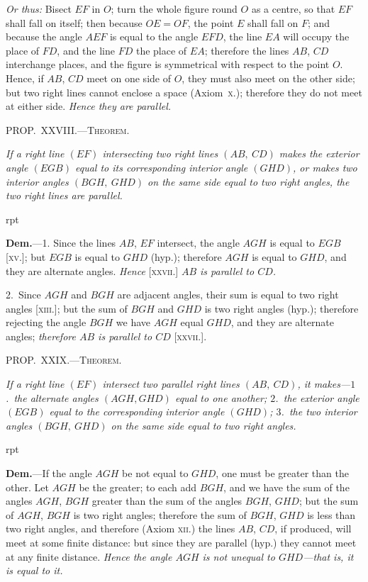 \documentclass[oneside]{book}
\newcounter{wrapwidth}
\newcommand\mypropl[2]{
\bigskip\Needspace*{4\baselineskip}\begin{center}\textsc{#1}\end{center}
\hspace{\parindent}\emph{#2}\par\medskip
}
\newcommand\imgflow[3]{
\setcounter{wrapwidth}{#1}

\begin{wrapfigure}[#2]{r}{\value{wrapwidth}pt}
\begin{center}
\vspace{-0.3in}

\end{center}
\end{wrapfigure}
}
\begin{document}
\textit{Or thus:} Bisect $EF$ in $O$; turn the whole figure
round $O$ as a centre, so that $EF$ shall fall on itself;
then because $OE = OF$, the point $E$ shall fall on $F$;
and because the angle $AEF$ is equal to the angle $EFD$,
the line $EA$ will occupy the place of $FD$, and the line
$FD$ the place of $EA$; therefore the lines $AB$, $CD$ interchange
places, and the figure is symmetrical with respect
to the point $O$. Hence, if $AB$, $CD$ meet on one
side of $O$, they must also meet on the other side; but
two right lines cannot enclose a space (Axiom~\textsc{x}.);
therefore they do not meet at either side. \textit{Hence they
are parallel.}


\mypropl{PROP\@.~XXVIII\@.---Theorem.}{If a right line $(EF)$ intersecting two right lines $(AB,\ CD)$
makes the exterior angle $(EGB)$ equal to its corresponding
interior angle $(GHD)$, or makes two interior
angles $(BGH,\ GHD)$ on the same side equal to two right
angles, the two right lines are parallel.}


\imgflow{133}{8}{f048}

\textbf{Dem.}---1. Since the lines $AB$, $EF$ intersect, the
angle $AGH$ is equal to $EGB$
[\textsc{xv}.]; but $EGB$ is equal to
$GHD$ (hyp.); therefore $AGH$
is equal to $GHD$, and they
are alternate angles. \textit{Hence}
[\textsc{xxvii}.] \textit{$AB$ is parallel to
$CD$.}

2.~Since $AGH$ and $BGH$
are adjacent angles, their sum is equal to two right
angles [\textsc{xiii}.]; but the sum of $BGH$ and $GHD$ is two
right angles (hyp.); therefore rejecting the angle $BGH$
we have $AGH$ equal $GHD$, and they are alternate
angles; \textit{therefore $AB$ is parallel to $CD$} [\textsc{xxvii}.].




\mypropl{PROP\@.~XXIX\@.---Theorem.}{If a right line $(EF)$ intersect two parallel right lines
$(AB,\ CD)$, it makes---$1$.~the alternate angles $(AGH, GHD)$
equal to one another; $2$.~the exterior angle $(EGB)$ equal
to the corresponding interior angle $(GHD)$; $3$.~the two
interior angles $(BGH,\ GHD)$ on the same side equal to
two right angles.}


\imgflow{135}{8}{f049}

\textbf{Dem.}---If the angle $AGH$ be not equal to $GHD$, one
must be greater than the
other. Let $AGH$ be the
greater; to each add $BGH$,
and we have the sum of the
angles $AGH$, $BGH$ greater
than the sum of the angles
$BGH$, $GHD$; but the sum of
$AGH$, $BGH$ is two right
angles; therefore the sum of $BGH$, $GHD$ is less than
two right angles, and therefore (Axiom \textsc{xii.}) the lines
$AB$, $CD$, if produced, will meet at some finite distance:
but since they are parallel (hyp.) they cannot meet at
any finite distance. \textit{Hence the angle $AGH$ is not unequal
to $GHD$---that is, it is equal to it.}
\end{document}
